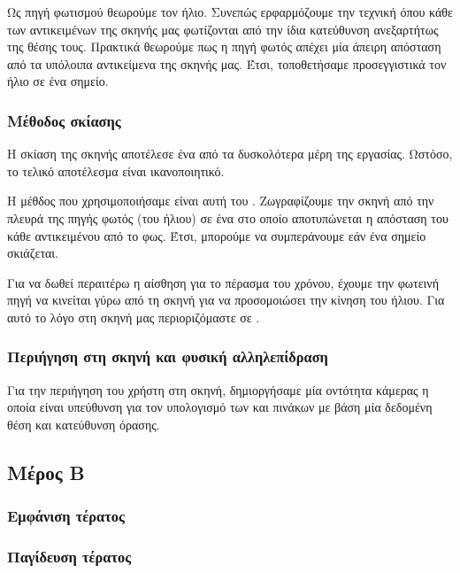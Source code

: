 \documentclass[11pt]{scrartcl} %
\begin{document}
Ως πηγή φωτισμού θεωρούμε τον ήλιο. Συνεπώς ερφαρμόζουμε την τεχνική  όπου 
κάθε  των αντικειμένων της σκηνής μας φωτίζονται από την ίδια κατεύθυνση ανεξαρτήτως της θέσης τους.
Πρακτικά θεωρούμε πως η πηγή φωτός απέχει μία άπειρη απόσταση από τα υπόλοιπα αντικείμενα της σκηνής μας.
Έτσι, τοποθετήσαμε προσεγγιστικά τον ήλιο σε ένα  σημείο. 


\subsubsection{Μέθοδος σκίασης}

Η σκίαση της σκηνής αποτέλεσε ένα από τα δυσκολότερα μέρη της εργασίας. Ωστόσο, το τελικό αποτέλεσμα 
είναι ικανοποιητικό. 

Η μέθδος που χρησιμοποιήσαμε είναι αυτή του . Ζωγραφίζουμε την σκηνή από την πλευρά 
της πηγής φωτός (του ήλιου) σε ένα  στο οποίο αποτυπώνεται η απόσταση του κάθε αντικειμένου 
από το φως. Έτσι, μπορούμε να συμπεράνουμε εάν ένα σημείο σκιάζεται. 

Για να δωθεί περαιτέρω η αίσθηση για το πέρασμα του χρόνου, έχουμε την φωτεινή πηγή να κινείται 
γύρω από τη σκηνή για να προσομοιώσει την κίνηση του ήλιου. 
Για αυτό το λόγο στη σκηνή μας περιοριζόμαστε σε .


\subsubsection{Περιήγηση στη σκηνή και φυσική αλληλεπίδραση}

Για την περιήγηση του χρήστη στη σκηνή, δημιοργήσαμε μία οντότητα κάμερας η οποία είναι υπεύθυνση 
για τον υπολογισμό των  και  πινάκων με βάση μία δεδομένη θέση και κατεύθυνση όρασης.


\subsection{Μέρος Β}

\subsubsection{Εμφάνιση τέρατος}

\subsubsection{Παγίδευση τέρατος}
\end{document}
